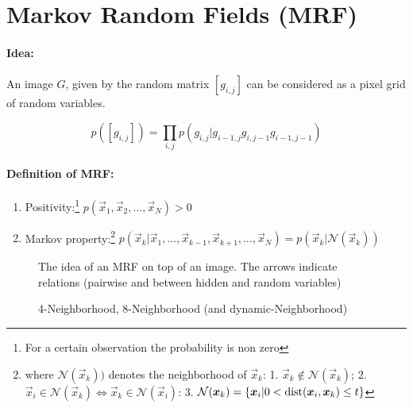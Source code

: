 
\section{Markov Random Fields (MRF)}

\paragraph{Idea:} An image $G$, given by the random matrix $[g_{i,j}]$ can be considered as a pixel grid of random variables.


\begin{equation*}
    p([g_{i, j}]) = \prod_{i,j} p(g_{i, j} | g_{i-1, j} g_{i, j-1} g_{i-1, j-1})
\end{equation*}

\paragraph{Definition of MRF:}
\begin{enumerate}
    \item Positivity:\footnote{For a certain observation the probability is non zero} $ p(\vec{x}_1, \vec{x}_2, \dots, \vec{x}_N) > 0$
    \item Markov property:\footnote{where $\mathcal{N}(\vec{x}_k))$ denotes the neighborhood of $\vec{x}_k$: 1. $\vec{x}_k \notin \mathcal{N}(\vec{x}_k)$; 2. $\vec{x}_i \in \mathcal{N}(\vec{x}_k) \Leftrightarrow \vec{x}_k \in \mathcal{N}(\vec{x}_i)$: 3. $\mathcal{N}(\bm{x}_k) = \{\bm{x}_i|0 < \operatorname*{\mathrm{dist}}(\bm{x}_i, \bm{x}_k) \le t\}$} $ p(\vec{x}_k |\vec{x}_1, \dots, \vec{x}_{k-1}, \vec{x}_{k+1}, \dots, \vec{x}_N) = p(\vec{x}_k | \mathcal{N}(\vec{x}_k)) $
\end{enumerate}


\begin{figure}[H]
  \centering
  \begin{minipage}[t]{0.45\textwidth}
    \centering
    
		\caption[Markov Random Field]{The idea of an MRF on top of an image. The arrows indicate relations (pairwise and between hidden and random variables)}
  \end{minipage}
  \hfill
  \begin{minipage}[t]{0.45\textwidth}
    \centering
    
		\caption{4-Neighborhood, 8-Neighborhood (and dynamic-Neighborhood)}
  \end{minipage}
\end{figure}

